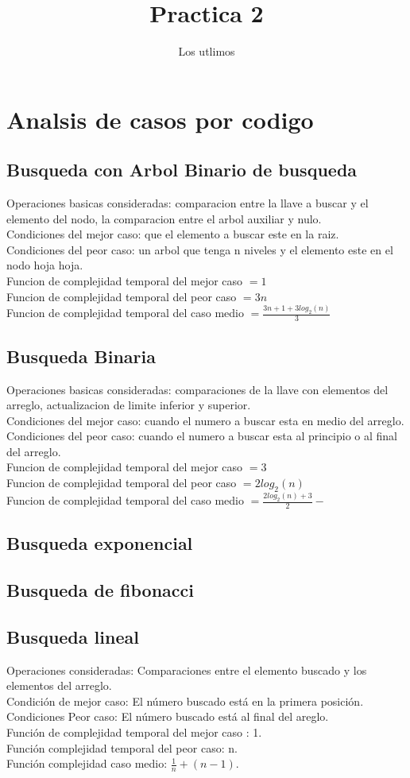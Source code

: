 \documentclass[12pt]{report}
\title{Practica 2}
\author{Los utlimos}
\begin{document}
\section*{Analsis de casos por codigo}
\subsection*{Busqueda con Arbol Binario de busqueda}
Operaciones basicas consideradas: comparacion entre la llave a buscar y el elemento del nodo, la comparacion entre el arbol auxiliar y nulo.\\
Condiciones del mejor caso: que el elemento a buscar este en la raiz.\\
Condiciones del peor caso: un arbol que tenga n niveles y el elemento este en el nodo hoja hoja.\\
Funcion de complejidad temporal del mejor caso $= 1$\\
Funcion de complejidad temporal del peor caso $= 3n$\\
Funcion de complejidad temporal del caso medio $= \frac{3n+1+3log_2(n)}{3}$
\subsection*{Busqueda Binaria}
Operaciones basicas consideradas: comparaciones de la llave con elementos del arreglo, actualizacion de limite inferior y superior.\\
Condiciones del mejor caso: cuando el numero a buscar esta en medio del arreglo.\\
Condiciones del peor caso: cuando el numero a buscar esta al principio o al final del arreglo.\\
Funcion de complejidad temporal del mejor caso $= 3$\\
Funcion de complejidad temporal del peor caso $= 2log_2(n)$\\
Funcion de complejidad temporal del caso medio $= \frac{2log_2(n) + 3}{2}-$
\subsection*{Busqueda exponencial}

\subsection*{Busqueda de fibonacci}

\subsection*{Busqueda lineal}
Operaciones consideradas: Comparaciones entre el elemento buscado y los elementos del arreglo.\\
Condición de mejor caso: El número buscado está en la primera posición. \\
Condiciones Peor caso: El número buscado está al final del areglo. \\
Función de complejidad temporal del mejor caso : 1. \\
Función complejidad temporal del peor caso: n. \\
Función complejidad caso medio: $\frac{1}{n}+(n-1)$.\\
\end{document}
